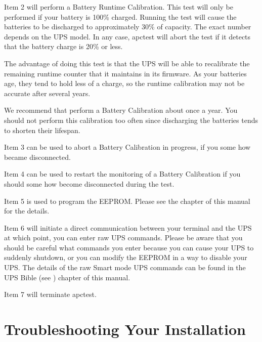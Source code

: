 {{{{Item 2 will perform a Battery Runtime Calibration. This test will only be
performed if your battery is 100\% charged. Running the test will cause the
batteries to be discharged to approximately 30\% of capacity. The exact number
depends on the UPS model. In any case, apctest will abort the test if it
detects that the battery charge is 20\% or less.  

The advantage of doing this test is that the UPS will be able to recalibrate
the remaining runtime counter that it maintains in its firmware. As your
batteries age, they tend to hold less of a charge, so the runtime calibration
may not be accurate after several years.  

We recommend that perform a Battery Calibration about once a year. You should
not perform this calibration too often since discharging the batteries tends
to shorten their lifespan.  

Item 3 can be used to abort a Battery Calibration in progress, if you some how
became disconnected.  

Item 4 can be used to restart the monitoring of a Battery Calibration if you
should some how become disconnected during the test.  

Item 5 is used to program the EEPROM. Please see the 
 chapter
of this manual for the details.  

Item 6 will initiate a direct communication between your terminal and the UPS
at which point, you can enter raw UPS commands. Please be aware that you
should be careful what commands you enter because you can cause your UPS to
suddenly shutdown, or you can modify the EEPROM in a way to disable your UPS.
The details of the raw Smart mode UPS commands can be found in the UPS Bible
(see 
) chapter of this
manual.  

Item 7 will terminate apctest. 

\label{Troubleshooting-Your-Installation}

\section*{Troubleshooting Your Installation}

\label{index-Troubleshooting-_0028see-problems_0029-101}
\label{index-Problems-102}

}}}}
